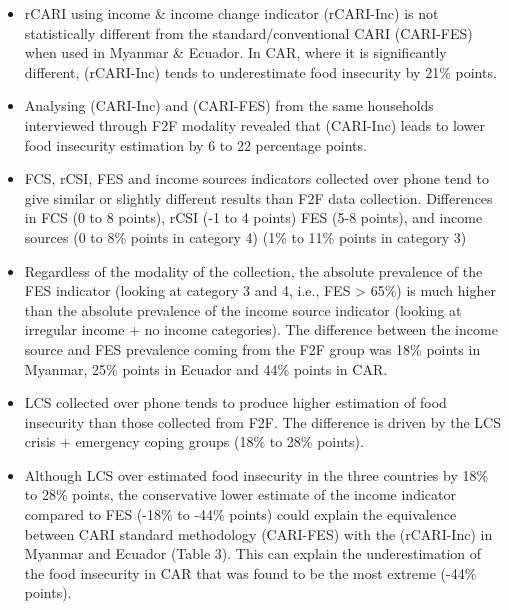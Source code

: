 \documentclass[11pt,harvard]{article}
\begin{document}
\begin{itemize}[label=--, left=1.5em]
	\item[1.]	rCARI using income \& income change indicator (rCARI-Inc) is not statistically different from the standard/conventional CARI (CARI-FES) when used in Myanmar \& Ecuador. In CAR, where it is significantly different, (rCARI-Inc) tends to underestimate food insecurity by 21\% points. 
	
	\item[2.]	Analysing (CARI-Inc) and (CARI-FES) from the same households interviewed through F2F modality revealed that (CARI-Inc) leads to lower food insecurity estimation by 6 to 22 percentage points. 
	
	\item[3.]	FCS, rCSI, FES and income sources indicators collected over phone tend to give similar or slightly different results than F2F data collection. Differences in FCS (0 to 8 points), rCSI (-1 to 4 points) FES (5-8 points), and income sources (0 to 8\% points in category 4) (1\% to 11\% points in category 3)
	
	\item[4.]	Regardless of the modality of the collection, the absolute prevalence of the FES indicator (looking at category 3 and 4, i.e., FES > 65\%) is much higher than the absolute prevalence of the income source indicator (looking at irregular income + no income categories). The difference between the income source and FES prevalence coming from the F2F group was 18\% points in Myanmar, 25\% points in Ecuador and 44\% points in CAR. 
	
	\item[5.] LCS collected over phone tends to produce higher estimation of food insecurity than those	collected from F2F. The difference is driven by the LCS crisis + emergency coping groups (18\% to 28\% points).
	
	\item[6.]	Although LCS over estimated food insecurity in the three countries by 18\% to 28\% points, the conservative lower estimate of the income indicator compared to FES (-18\% to -44\% points) could explain the equivalence between CARI standard methodology (CARI-FES) with the (rCARI-Inc) in Myanmar and Ecuador (Table 3). This can explain the underestimation of the food insecurity in CAR that was found to be the most extreme (-44\% points). 
	
\end{itemize}


\pagebreak
\end{document}
